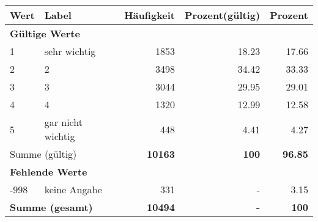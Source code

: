      \begin{longtable}{lXrrr}
     \toprule
     \textbf{Wert} & \textbf{Label} & \textbf{Häufigkeit} & \textbf{Prozent(gültig)} & \textbf{Prozent} \\
     \endhead
     \midrule
     \multicolumn{5}{l}{\textbf{Gültige Werte}}\\

     1 &
     \multicolumn{1}{X}{ sehr wichtig   } &


       \num{1853} &
       \num[round-mode=places,round-precision=2]{18.23} &
         \num[round-mode=places,round-precision=2]{17.66} \\

     2 &
     \multicolumn{1}{X}{ 2   } &


       \num{3498} &
       \num[round-mode=places,round-precision=2]{34.42} &
         \num[round-mode=places,round-precision=2]{33.33} \\

     3 &
     \multicolumn{1}{X}{ 3   } &


       \num{3044} &
       \num[round-mode=places,round-precision=2]{29.95} &
         \num[round-mode=places,round-precision=2]{29.01} \\

     4 &
     \multicolumn{1}{X}{ 4   } &


       \num{1320} &
       \num[round-mode=places,round-precision=2]{12.99} &
         \num[round-mode=places,round-precision=2]{12.58} \\

     5 &
     \multicolumn{1}{X}{ gar nicht wichtig   } &


       \num{448} &
       \num[round-mode=places,round-precision=2]{4.41} &
         \num[round-mode=places,round-precision=2]{4.27} \\
     \midrule
     \multicolumn{2}{l}{Summe (gültig)} &
       \textbf{\num{10163}} &
     \textbf{\num{100}} &
       \textbf{\num[round-mode=places,round-precision=2]{96.85}} \\
     \multicolumn{5}{l}{\textbf{Fehlende Werte}}\\
       -998 &
       keine Angabe &
         \num{331} &
        - &
         \num[round-mode=places,round-precision=2]{3.15} \\
     \midrule
     \multicolumn{2}{l}{\textbf{Summe (gesamt)}} &
          \textbf{\num{10494}} &
        \textbf{-} &
        \textbf{\num{100}} \\
     \bottomrule
     \end{longtable}
     
